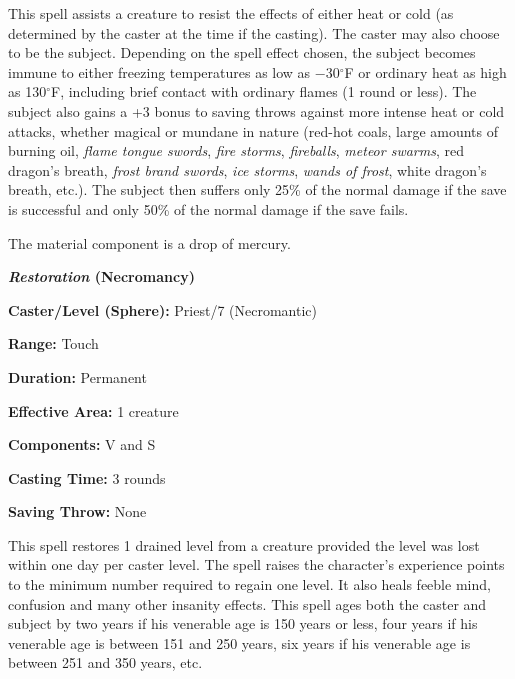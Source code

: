 \begin{multicols}{2}
\begin{minipage}{\columnwidth}
\end{minipage}

This spell assists a creature to resist the effects of either heat or cold (as determined by the caster at the time if the casting).  The caster may also choose to be the subject.  Depending on the spell effect chosen, the subject becomes immune to either freezing temperatures as low as $-30$$^\circ$F or ordinary heat as high as 130$^\circ$F, including brief contact with ordinary flames (1 round or less).  The subject also gains a +3 bonus to saving throws against more intense heat or cold attacks, whether magical or mundane in nature (red-hot coals, large amounts of burning oil, \textit{flame tongue swords}, \textit{fire storms}, \textit{fireballs}, \textit{meteor swarms}, red dragon's breath, \textit{frost brand swords}, \textit{ice storms}, \textit{wands of frost}, white dragon's breath, etc.).  The subject then suffers only 25\% of the normal damage if the save is successful and only 50\% of the normal damage if the save fails.
 
The material component is a drop of mercury.

\vspace{1em}

\noindent
\begin{minipage}{\columnwidth}

\noindent \textbf{\textit{Restoration} (Necromancy)}

\noindent \textbf{Caster/Level (Sphere):} Priest/7 (Necromantic)

\noindent \textbf{Range:} Touch

\noindent \textbf{Duration:} Permanent

\noindent \textbf{Effective Area:} 1 creature

\noindent \textbf{Components:} V and S

\noindent \textbf{Casting Time:} 3 rounds

\noindent \textbf{Saving Throw:} None

\end{minipage}

This spell restores 1 drained level from a creature provided the level was lost within one day per caster level.  The spell raises the character's experience points to the minimum number required to regain one level.  It also heals feeble mind, confusion and many other insanity effects.  This spell ages both the caster and subject by two years if his venerable age is 150 years or less, four years if his venerable age is between 151 and 250 years, six years if his venerable age is between 251 and 350 years, etc.


\end{multicols}

